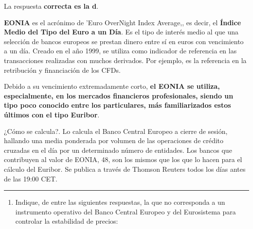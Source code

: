 \documentclass[
  letterpaper,
  DIV=11,
  numbers=noendperiod]{scrreprt}
\providecommand{\tightlist}{%
  \setlength{\itemsep}{0pt}\setlength{\parskip}{0pt}}\usepackage{longtable,booktabs,array}
\begin{document}
\begin{tcolorbox}[enhanced jigsaw, left=2mm, opacityback=0, colback=white, breakable, arc=.35mm, bottomrule=.15mm, rightrule=.15mm, toprule=.15mm, leftrule=.75mm, colframe=quarto-callout-tip-color-frame]
\begin{minipage}[t]{5.5mm}
\textcolor{quarto-callout-tip-color}{\faLightbulb}
\end{minipage}%
\begin{minipage}[t]{\textwidth - 5.5mm}

La respuesta \textbf{correcta es la d}.

\textbf{EONIA} es el acrónimo de 'Euro OverNight Index Average,, es
decir, el \textbf{Índice Medio del Tipo del Euro a un Día}. Es el tipo
de interés medio al que una selección de bancos europeos se prestan
dinero entre sí en euros con vencimiento a un día. Creado en el año
1999, se utiliza como indicador de referencia en las transacciones
realizadas con muchos derivados. Por ejemplo, es la referencia en la
retribución y financiación de los CFDs.

Debido a su vencimiento extremadamente corto, \textbf{el EONIA se
utiliza, especialmente, en los mercados financieros profesionales,
siendo un tipo poco conocido entre los particulares, más familiarizados
estos últimos con el tipo Euribor}.

¿Cómo se calcula?. Lo calcula el Banco Central Europeo a cierre de
sesión, hallando una media ponderada por volumen de las operaciones de
crédito cruzadas en el día por un determinado número de entidades. Los
bancos que contribuyen al valor de EONIA, 48, son los mismos que los que
lo hacen para el cálculo del Euribor. Se publica a través de Thomson
Reuters todos los días antes de las 19:00 CET.

\end{minipage}%
\end{tcolorbox}

\begin{center}\rule{0.5\linewidth}{0.5pt}\end{center}

\begin{enumerate}
\def\labelenumi{\arabic{enumi}.}
\setcounter{enumi}{10}
\tightlist
\item
  Indique, de entre las siguientes respuestas, la que no corresponda a
  un instrumento operativo del Banco Central Europeo y del Eurosistema
  para controlar la estabilidad de precios:
\end{enumerate}
\end{document}
